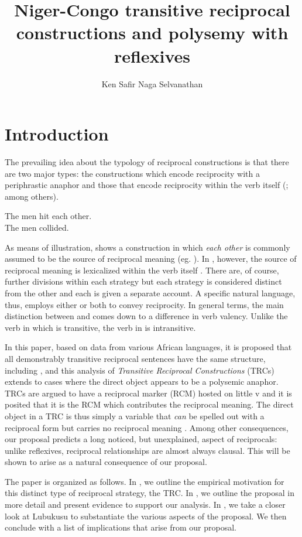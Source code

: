 \documentclass[output=paper]{langsci/langscibook}
\title{Niger-Congo transitive reciprocal constructions and polysemy with reflexives}
\author{%
Ken Safir\lastand 
Naga Selvanathan \affiliation{Rutgers University} 
}
\begin{document}
\section{Introduction}

The prevailing idea about the typology of reciprocal constructions is that there are two major types: the constructions which encode reciprocity with a periphrastic anaphor and those that encode reciprocity within the verb itself (\citealt{KonigGast2008}; \citealt{Siloni2012} among others).


\ea
\ea
The men hit each other.  \\
\ex
The men collided.\\
\z
\z

As means of illustration,  shows a construction in which \textit{each other} is commonly assumed to be the source of reciprocal meaning (eg. \citealt{HeimEtAl1991}). In , however, the source of reciprocal meaning is lexicalized within the verb itself \citep{Siloni2012}.  There are, of course, further divisions within each strategy but each strategy is considered distinct from the other and each is given a separate account. A specific natural language, thus, employs either or both to convey reciprocity. In general terms, the main distinction between  and  comes down to a difference in verb valency. Unlike the verb in  which is transitive, the verb in  is intransitive.

In this paper, based on data from various African languages, it is proposed that all demonstrably transitive reciprocal sentences have the same structure, including , and this analysis of \textit{Transitive Reciprocal Constructions} (TRCs) extends to cases where the direct object appears to be a polysemic anaphor. TRCs are argued to have a reciprocal marker (RCM) hosted on little v and it is posited that it is the RCM which contributes the reciprocal meaning. The direct object in a TRC is thus simply a variable that \textit{can} be spelled out with a reciprocal form but carries no reciprocal meaning \citep{Safir2014}. Among other consequences, our proposal predicts a long noticed, but unexplained, aspect of reciprocals: unlike reflexives, reciprocal relationships are almost always clausal. This will be shown to arise as a natural consequence of our proposal.
 
The paper is organized as follows. In , we outline the empirical motivation for this distinct type of reciprocal strategy, the TRC. In , we outline the proposal in more detail and present evidence to support our analysis. In , we take a closer look at Lubukusu to substantiate the various aspects of the proposal. We then conclude with a list of implications that arise from our proposal.
\end{document}
